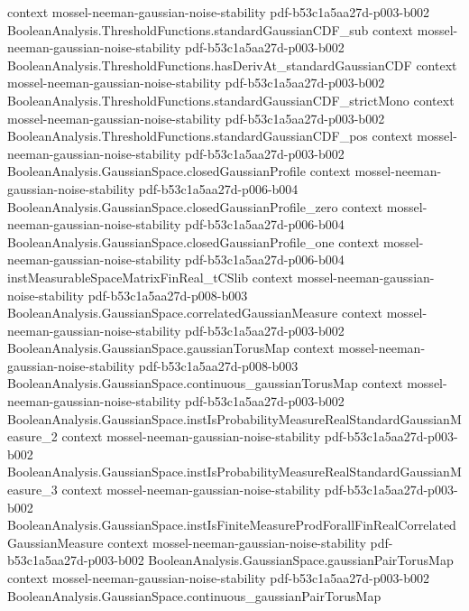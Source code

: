 \begin{theorem}
  {context}
  {mossel-neeman-gaussian-noise-stability}
  {pdf-b53c1a5aa27d-p003-b002}
\proofstep
  {BooleanAnalysis.ThresholdFunctions.standardGaussianCDF_sub}
  {context}
  {mossel-neeman-gaussian-noise-stability}
  {pdf-b53c1a5aa27d-p003-b002}
\proofstep
  {BooleanAnalysis.ThresholdFunctions.hasDerivAt_standardGaussianCDF}
  {context}
  {mossel-neeman-gaussian-noise-stability}
  {pdf-b53c1a5aa27d-p003-b002}
\proofstep
  {BooleanAnalysis.ThresholdFunctions.standardGaussianCDF_strictMono}
  {context}
  {mossel-neeman-gaussian-noise-stability}
  {pdf-b53c1a5aa27d-p003-b002}
\proofstep
  {BooleanAnalysis.ThresholdFunctions.standardGaussianCDF_pos}
  {context}
  {mossel-neeman-gaussian-noise-stability}
  {pdf-b53c1a5aa27d-p003-b002}
\proofstep
  {BooleanAnalysis.GaussianSpace.closedGaussianProfile}
  {context}
  {mossel-neeman-gaussian-noise-stability}
  {pdf-b53c1a5aa27d-p006-b004}
\proofstep
  {BooleanAnalysis.GaussianSpace.closedGaussianProfile_zero}
  {context}
  {mossel-neeman-gaussian-noise-stability}
  {pdf-b53c1a5aa27d-p006-b004}
\proofstep
  {BooleanAnalysis.GaussianSpace.closedGaussianProfile_one}
  {context}
  {mossel-neeman-gaussian-noise-stability}
  {pdf-b53c1a5aa27d-p006-b004}
\proofstep
  {instMeasurableSpaceMatrixFinReal_tCSlib}
  {context}
  {mossel-neeman-gaussian-noise-stability}
  {pdf-b53c1a5aa27d-p008-b003}
\proofstep
  {BooleanAnalysis.GaussianSpace.correlatedGaussianMeasure}
  {context}
  {mossel-neeman-gaussian-noise-stability}
  {pdf-b53c1a5aa27d-p003-b002}
\proofstep
  {BooleanAnalysis.GaussianSpace.gaussianTorusMap}
  {context}
  {mossel-neeman-gaussian-noise-stability}
  {pdf-b53c1a5aa27d-p008-b003}
\proofstep
  {BooleanAnalysis.GaussianSpace.continuous_gaussianTorusMap}
  {context}
  {mossel-neeman-gaussian-noise-stability}
  {pdf-b53c1a5aa27d-p003-b002}
\proofstep
  {BooleanAnalysis.GaussianSpace.instIsProbabilityMeasureRealStandardGaussianMeasure_2}
  {context}
  {mossel-neeman-gaussian-noise-stability}
  {pdf-b53c1a5aa27d-p003-b002}
\proofstep
  {BooleanAnalysis.GaussianSpace.instIsProbabilityMeasureRealStandardGaussianMeasure_3}
  {context}
  {mossel-neeman-gaussian-noise-stability}
  {pdf-b53c1a5aa27d-p003-b002}
\proofstep
  {BooleanAnalysis.GaussianSpace.instIsFiniteMeasureProdForallFinRealCorrelatedGaussianMeasure}
  {context}
  {mossel-neeman-gaussian-noise-stability}
  {pdf-b53c1a5aa27d-p003-b002}
\proofstep
  {BooleanAnalysis.GaussianSpace.gaussianPairTorusMap}
  {context}
  {mossel-neeman-gaussian-noise-stability}
  {pdf-b53c1a5aa27d-p003-b002}
\proofstep
  {BooleanAnalysis.GaussianSpace.continuous_gaussianPairTorusMap}

\end{theorem}
